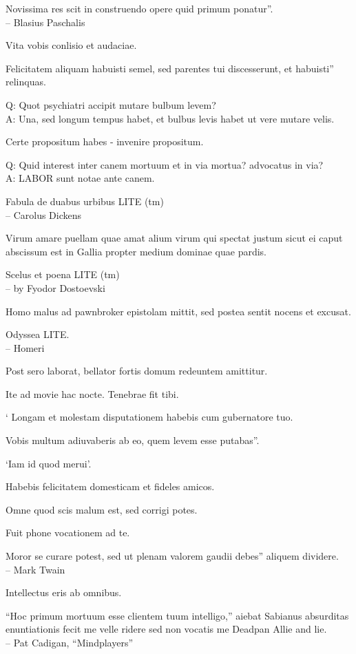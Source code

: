 \documentclass[titlepage,12pt]{memoir}
\begin{document}
Novissima res scit in construendo opere quid primum ponatur”.
\\-- Blasius Paschalis

Vita vobis conlisio et audaciae.

Felicitatem aliquam habuisti semel, sed parentes tui discesserunt, et habuisti”
relinquas.

Q: Quot psychiatri accipit mutare bulbum levem?\\
A: Una, sed longum tempus habet, et bulbus levis habet
ut vere mutare velis.

Certe propositum habes - invenire propositum.

Q: Quid interest inter canem mortuum et in via mortua?
advocatus in via?\\
A: LABOR sunt notae ante canem.

Fabula de duabus urbibus LITE (tm)
\\-- Carolus Dickens

Virum amare puellam quae amat alium virum qui spectat justum
sicut ei caput abscissum est in Gallia propter medium
dominae quae pardis.

Scelus et poena LITE (tm)
\\-- by Fyodor Dostoevski

Homo malus ad pawnbroker epistolam mittit, sed postea
sentit nocens et excusat.

Odyssea LITE.
\\-- Homeri

Post sero laborat, bellator fortis domum redeuntem amittitur.

Ite ad movie hac nocte. Tenebrae fit tibi.

‘ Longam et molestam disputationem habebis cum gubernatore tuo.

Vobis multum adiuvaberis ab eo, quem levem esse putabas”.

‘Iam id quod merui’.

 Habebis felicitatem domesticam et fideles amicos.

Omne quod scis malum est, sed corrigi potes.

Fuit phone vocationem ad te.

Moror se curare potest, sed ut plenam valorem gaudii debes”
aliquem dividere.
\\-- Mark Twain

Intellectus eris ab omnibus.

 “Hoc primum mortuum esse clientem tuum intelligo,” aiebat Sabianus
absurditas enuntiationis fecit me velle ridere sed non vocatis me
Deadpan Allie and lie.
\\-- Pat Cadigan, “Mindplayers”
\end{document}
